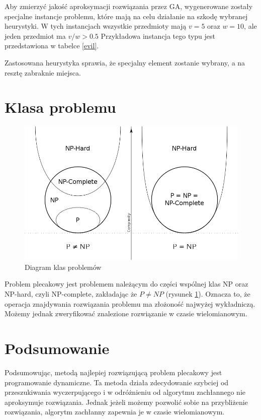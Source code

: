 \documentclass[12pt,twocolumn]{article}
\begin{document}
Aby zmierzyć jakość aproksymacji rozwiązania przez GA, wygenerowane zostały specjalne
instancje problemu, które mają na celu działanie na szkodę wybranej heurystyki.
W tych instancjach wszystkie przedmioty mają $v = 5$ oraz $w = 10$, ale jeden przedmiot ma $v/w > 0.5$
Przykładowa instancja tego typu jest przedstawiona w tabelce \ref{evil}.

Zastosowana heurystyka sprawia, że specjalny element zostanie wybrany, a na resztę zabraknie miejsca.


\section{Klasa problemu}

\begin{figure}
	\includegraphics[width=\linewidth]{pnp.png}
	\caption{Diagram klas problemów \label{pnp}}
\end{figure}

Problem plecakowy jest problemem należącym do części wspólnej klas NP oraz NP-hard, czyli NP-complete,
zakładając że $P \neq NP$ (rysunek \ref{pnp}).
Oznacza to, że operacja znajdywania rozwiązania problemu ma złożoność najwyżej wykładniczą.
Możemy jednak zweryfikować znalezione rozwiązanie w czasie wielomianowym.


\section{Podsumowanie}

Podsumowując, metodą najlepiej rozwiązującą problem plecakowy
jest programowanie dynamiczne. Ta metoda działa zdecydowanie szybciej od
przeszukiwania wyczerpującego i w odróżnieniu od algorytmu zachłannego
nie aproksymuje rozwiązania.
Jednak jeżeli możemy pozwolić sobie na przybliżenie rozwiązania,
algorytm zachłanny zapewnia je w czasie wielomianowym.
\end{document}
